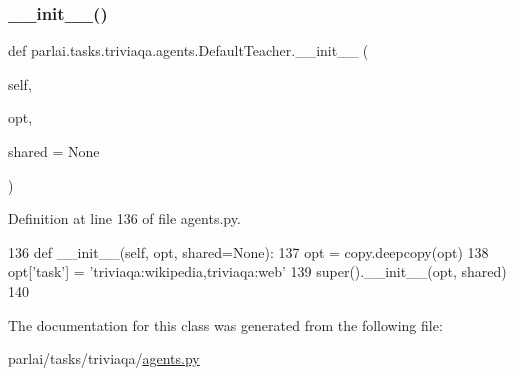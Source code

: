 \subsubsection{\texorpdfstring{\+\_\+\+\_\+init\+\_\+\+\_\+()}{\_\_init\_\_()}}
{\footnotesize\ttfamily def parlai.\+tasks.\+triviaqa.\+agents.\+Default\+Teacher.\+\_\+\+\_\+init\+\_\+\+\_\+ (\begin{DoxyParamCaption}\item[{}]{self,  }\item[{}]{opt,  }\item[{}]{shared = {\ttfamily None} }\end{DoxyParamCaption})}



Definition at line 136 of file agents.\+py.


\begin{DoxyCode}
136     \textcolor{keyword}{def }\_\_init\_\_(self, opt, shared=None):
137         opt = copy.deepcopy(opt)
138         opt[\textcolor{stringliteral}{'task'}] = \textcolor{stringliteral}{'triviaqa:wikipedia,triviaqa:web'}
139         super().\_\_init\_\_(opt, shared)
140 \end{DoxyCode}


The documentation for this class was generated from the following file\+:\begin{DoxyCompactItemize}
\item 
parlai/tasks/triviaqa/\hyperlink{parlai_2tasks_2triviaqa_2agents_8py}{agents.\+py}\end{DoxyCompactItemize}
